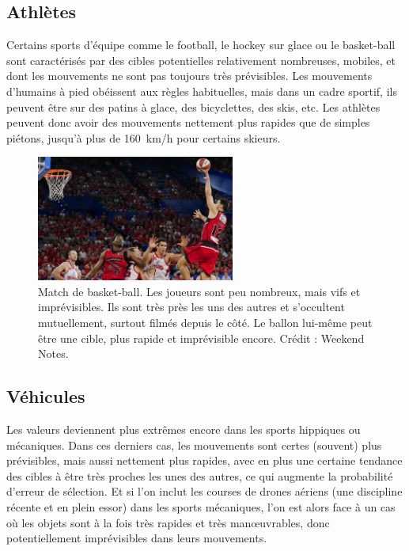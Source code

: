 	\FloatBarrier \subsection{Athlètes}
	
	Certains sports d'équipe comme le football, le hockey sur glace ou le basket-ball sont caractérisés par des cibles potentielles relativement nombreuses, mobiles, et dont les mouvements ne sont pas toujours très prévisibles. Les mouvements d'humains à pied obéissent aux règles habituelles, mais dans un cadre sportif, ils peuvent être sur des patins à glace, des bicyclettes, des skis, etc. Les athlètes peuvent donc avoir des mouvements nettement plus rapides que de simples piétons, jusqu'à plus de 160~km/h pour certains skieurs\footnotemark.
	
	
	\begin{figure}
		\centering
		\includegraphics[width=0.58\textwidth]{figures/ch1/basket}
		\caption[Match de basket-ball]{Match de basket-ball. Les joueurs sont peu nombreux, mais vifs et imprévisibles. Ils sont très près les uns des autres et s'occultent mutuellement, surtout filmés depuis le côté. Le ballon lui-même peut être une cible, plus rapide et imprévisible encore. Crédit : Weekend Notes.}
		\label{fig:basketball}
	\end{figure}
	
	
	\FloatBarrier \subsection{Véhicules}
	Les valeurs deviennent plus extrêmes encore dans les sports hippiques ou mécaniques. Dans ces derniers cas, les mouvements sont certes (souvent) plus prévisibles, mais aussi nettement plus rapides, avec en plus une certaine tendance des cibles à être très proches les unes des autres, ce qui augmente la probabilité d'erreur de sélection. Et si l'on inclut les courses de drones aériens\footnotemark{} (une discipline récente et en plein essor) dans les sports mécaniques, l'on est alors face à un cas où les objets sont à la fois très rapides et très manœuvrables, donc potentiellement imprévisibles dans leurs mouvements.
	
